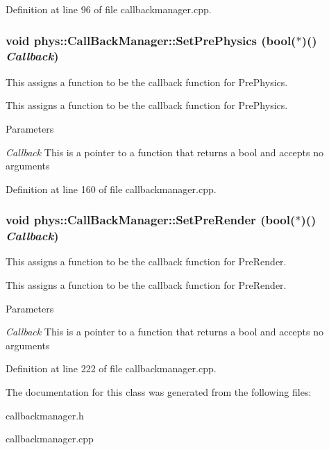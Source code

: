 Definition at line 96 of file callbackmanager.cpp.

\hypertarget{classphys_1_1CallBackManager_a3f06ccacd416b3109f20c30cd30f9efe}{
\subsubsection[{SetPrePhysics}]{\setlength{\rightskip}{0pt plus 5cm}void phys::CallBackManager::SetPrePhysics (bool($\ast$)() {\em Callback})}}
\label{d1/d47/classphys_1_1CallBackManager_a3f06ccacd416b3109f20c30cd30f9efe}


This assigns a function to be the callback function for PrePhysics. 

This assigns a function to be the callback function for PrePhysics. 
\begin{DoxyParams}{Parameters}
\item[{\em Callback}]This is a pointer to a function that returns a bool and accepts no arguments \end{DoxyParams}


Definition at line 160 of file callbackmanager.cpp.

\hypertarget{classphys_1_1CallBackManager_a1e060fd479413457a798ea3c6b2bcb4d}{
\subsubsection[{SetPreRender}]{\setlength{\rightskip}{0pt plus 5cm}void phys::CallBackManager::SetPreRender (bool($\ast$)() {\em Callback})}}
\label{d1/d47/classphys_1_1CallBackManager_a1e060fd479413457a798ea3c6b2bcb4d}


This assigns a function to be the callback function for PreRender. 

This assigns a function to be the callback function for PreRender. 
\begin{DoxyParams}{Parameters}
\item[{\em Callback}]This is a pointer to a function that returns a bool and accepts no arguments \end{DoxyParams}


Definition at line 222 of file callbackmanager.cpp.



The documentation for this class was generated from the following files:\begin{DoxyCompactItemize}
\item 
callbackmanager.h\item 
callbackmanager.cpp\end{DoxyCompactItemize}
